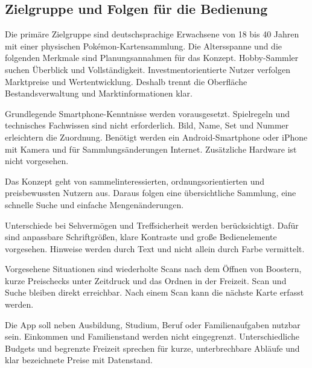\subsection{Zielgruppe und Folgen für die Bedienung}
Die primäre Zielgruppe sind deutschsprachige Erwachsene von 18 bis 40 Jahren mit einer physischen Pokémon-Kartensammlung. Die Altersspanne und die folgenden Merkmale sind Planungsannahmen für das Konzept. Hobby-Sammler suchen Überblick und Vollständigkeit. Investmentorientierte Nutzer verfolgen Marktpreise und Wertentwicklung. Deshalb trennt die Oberfläche Bestandsverwaltung und Marktinformationen klar.

Grundlegende Smartphone-Kenntnisse werden vorausgesetzt. Spielregeln und technisches Fachwissen sind nicht erforderlich. Bild, Name, Set und Nummer erleichtern die Zuordnung. Benötigt werden ein Android-Smartphone oder iPhone mit Kamera und für Sammlungsänderungen Internet. Zusätzliche Hardware ist nicht vorgesehen.

Das Konzept geht von sammelinteressierten, ordnungsorientierten und preisbewussten Nutzern aus. Daraus folgen eine übersichtliche Sammlung, eine schnelle Suche und einfache Mengenänderungen.

Unterschiede bei Sehvermögen und Treffsicherheit werden berücksichtigt. Dafür sind anpassbare Schriftgrößen, klare Kontraste und große Bedienelemente vorgesehen. Hinweise werden durch Text und nicht allein durch Farbe vermittelt.

Vorgesehene Situationen sind wiederholte Scans nach dem Öffnen von Boostern, kurze Preischecks unter Zeitdruck und das Ordnen in der Freizeit. Scan und Suche bleiben direkt erreichbar. Nach einem Scan kann die nächste Karte erfasst werden.

Die App soll neben Ausbildung, Studium, Beruf oder Familienaufgaben nutzbar sein. Einkommen und Familienstand werden nicht eingegrenzt. Unterschiedliche Budgets und begrenzte Freizeit sprechen für kurze, unterbrechbare Abläufe und klar bezeichnete Preise mit Datenstand.

